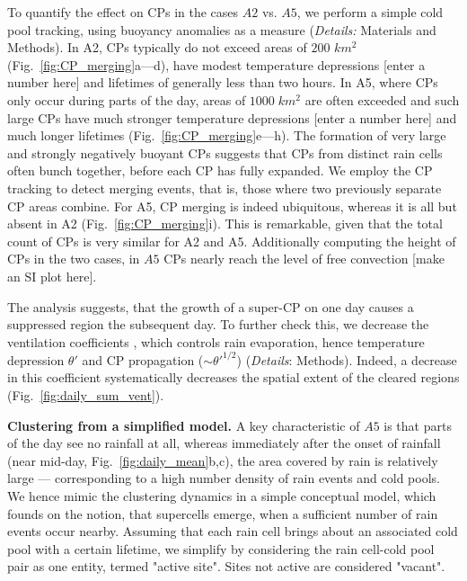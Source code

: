 \documentclass[draft,linenumbers]{agujournal2019}
\begin{document}
To quantify the effect on CPs in the cases $A2$ vs. $A5$, we perform a simple cold pool tracking, using buoyancy anomalies as a measure ({\it Details:} Materials and Methods).
In A2, CPs typically do not exceed areas of $200$ $km^2$ (Fig.~\ref{fig:CP_merging}a---d), have modest temperature depressions [enter a number here] and lifetimes of generally less than two hours. 
In A5, where CPs only occur during parts of the day, areas of $1000\;km^2$ are often exceeded and such large CPs have much stronger temperature depressions [enter a number here] and much longer lifetimes (Fig.~\ref{fig:CP_merging}e---h). 
The formation of very large and strongly negatively buoyant CPs suggests that CPs from distinct rain cells often bunch together, before each CP has fully expanded. 
We employ the CP tracking to detect merging events, that is, those where two previously separate CP areas combine.
For A5, CP merging is indeed ubiquitous, whereas it is all but absent in A2 (Fig.~\ref{fig:CP_merging}i).
This is remarkable, given that the total count of CPs is very similar for A2 and A5.
Additionally computing the height of CPs in the two cases, in $A5$ CPs nearly reach the level of free convection [make an SI plot here]. 

The analysis suggests, that the growth of a super-CP on one day causes a suppressed region the subsequent day. 
To further check this, we decrease the ventilation coefficients \cite{seifert2006two}, which controls rain evaporation, hence temperature depression $\theta'$ and CP propagation ($\sim \theta'^{1/2}$) ({\it Details}: Methods).
Indeed, a decrease in this coefficient systematically decreases the spatial extent of the cleared regions (Fig.~\ref{fig:daily_sum_vent}).

\noindent
{\bf Clustering from a simplified model.}
A key characteristic of $A5$ is that parts of the day see no rainfall at all, whereas immediately after the onset of rainfall (near mid-day, Fig.~\ref{fig:daily_mean}b,c), the area covered by rain is relatively large --- corresponding to a high number density of rain events and cold pools.
We hence mimic the clustering dynamics in a simple conceptual model, which founds on the notion, that supercells emerge, when a sufficient number of rain events occur nearby. 
Assuming that each rain cell brings about an associated cold pool with a certain lifetime, we simplify by considering the rain cell-cold pool pair as one entity, termed "active site". 
Sites not active are considered "vacant".
\end{document}
